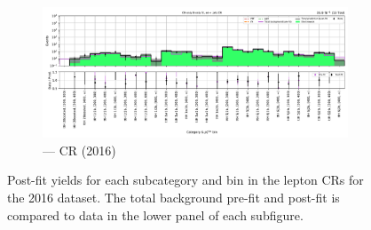 \begin{figure}[htbp]
    \begin{subfigure}[b]{0.65\textwidth}
        \includegraphics[width=\textwidth]{chapters/higgstoinv/figures/mountain_ranges/2016/ttH/Zee_tree_fit_b-abs_values_ttH_cats.pdf}
        \caption{\ttH --- \doubleEleCr \gls{CR} (2016)}
    \end{subfigure}
    \caption[Post-fit yields for each \ttH subcategory and \ptmiss bin in the lepton control regions for the 2016 dataset]{Post-fit yields for each \ttH subcategory and \ptmiss bin in the lepton \glspl{CR} for the 2016 dataset. The total background pre-fit and post-fit is compared to data in the lower panel of each subfigure.}
    \label{fig:htoinv_mountain_range_ttH_2016_CRs}
\end{figure}

